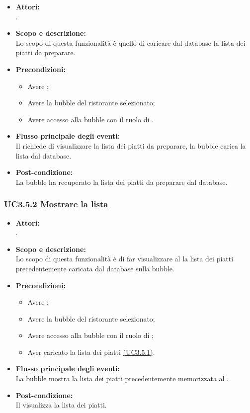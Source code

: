 \begin{itemize}
	\item \textbf{Attori:}
	\\.
	\item \textbf{Scopo e descrizione:} 
	\\Lo scopo di questa funzionalità è quello di caricare dal database la lista dei piatti da preparare.
	\item \textbf{Precondizioni:}
	\begin{itemize}
		\item Avere ;
		\item Avere la bubble del ristorante selezionato;
		\item Avere accesso alla bubble con il ruolo di .
	\end{itemize}
	\item \textbf{Flusso principale degli eventi:}
	\\Il {} richiede di visualizzare la lista dei piatti da preparare, la bubble carica la lista dal database.
	\item \textbf{Post-condizione:}
	\\La bubble ha recuperato la lista dei piatti da preparare dal database.
\end{itemize}

\subsubsection{UC3.5.2 Mostrare la lista} \label{UC3.5.2}

\begin{itemize}
	\item \textbf{Attori:}
	\\.
	\item \textbf{Scopo e descrizione:} 
	\\Lo scopo di questa funzionalità è di far visualizzare al  la lista dei piatti precedentemente caricata dal database sulla bubble.
	\item \textbf{Precondizioni:}
	\begin{itemize}
		\item Avere ;
		\item Avere la bubble del ristorante selezionato;
		\item Avere accesso alla bubble con il ruolo di ;
		\item Aver caricato la lista dei piatti \hyperref[UC3.5.1]{(UC3.5.1)}.
	\end{itemize}
	\item \textbf{Flusso principale degli eventi:}
	\\La bubble mostra la lista dei piatti precedentemente memorizzata al .
	\item \textbf{Post-condizione:}
	\\Il {} visualizza la lista dei piatti.
\end{itemize}

